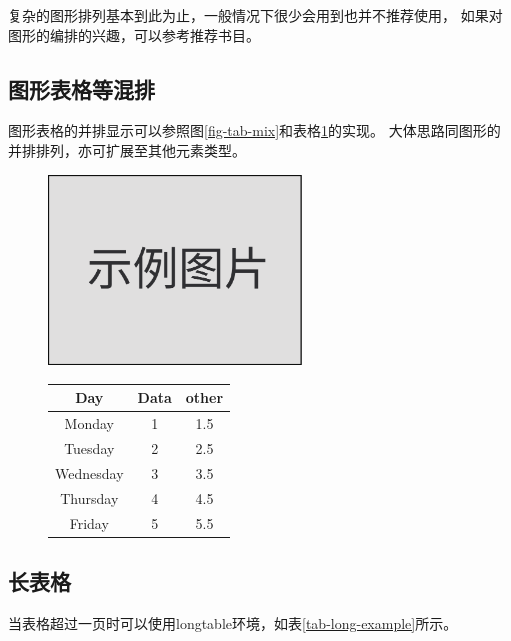 复杂的图形排列基本到此为止，一般情况下很少会用到也并不推荐使用，
如果对图形的编排的兴趣，可以参考推荐书目。


\subsection{图形表格等混排}
\label{subsec-morefigtab}
图形表格的并排显示可以参照图\ref{fig-tab-mix}和表格\ref{tab-fig-mix}的实现。
大体思路同图形的并排排列，亦可扩展至其他元素类型。
\begin{figure}[h!]
    \begin{minipage}{0.5\textwidth}
        \centering
        \includegraphics[width=0.6\textwidth]{figure/image.pdf}
        \label{fig-tab-mix}
    \end{minipage}
    \begin{minipage}{0.5\textwidth}
        \centering
        \begin{tabular}{c||c|c} \hline
            Day       & Data & other \\ \hline \hline
            Monday    & 1    & 1.5   \\
            Tuesday   & 2    & 2.5   \\
            Wednesday & 3    & 3.5   \\
            Thursday  & 4    & 4.5   \\
            Friday    & 5    & 5.5   \\ \hline
        \end{tabular}
        \label{tab-fig-mix}
    \end{minipage}
\end{figure}

\subsection{长表格}
\label{subsec-longtab}
当表格超过一页时可以使用longtable环境，如表\ref{tab-long-example}所示。

